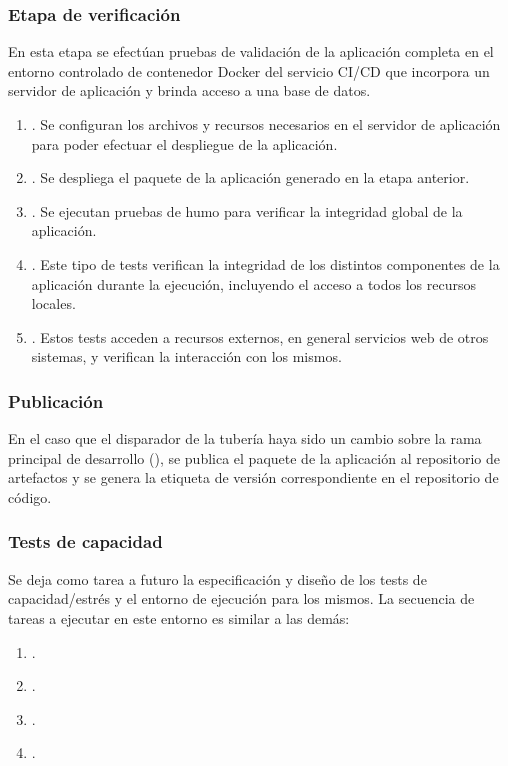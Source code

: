 \subsubsection{Etapa de verificación}
%
En esta etapa se efectúan pruebas de validación de la aplicación
completa en el entorno controlado de contenedor Docker del servicio
CI/CD que incorpora un servidor de aplicación y brinda acceso a una
base de datos.
%
\begin{enumerate}
\item {}. Se configuran
  los archivos y recursos necesarios en el servidor de aplicación para
  poder efectuar el despliegue de la aplicación.
\item {}. Se despliega el paquete de la
  aplicación generado en la etapa anterior.
\item {}. Se ejecutan pruebas de humo para
  verificar la integridad global de la aplicación.
\item {}. Este tipo de tests
  verifican la integridad de los distintos componentes de la
  aplicación durante la ejecución, incluyendo el acceso a todos los
  recursos locales.
\item {}. Estos tests acceden a
  recursos externos, en general servicios web de otros sistemas, y
  verifican la interacción con los mismos.
\end{enumerate}
%
\subsubsection{Publicación}
%
En el caso que el disparador de la tubería haya sido un cambio sobre
la rama principal de desarrollo (), se publica el
paquete de la aplicación al repositorio de artefactos y se genera la
etiqueta de versión correspondiente en el repositorio de código.
%
\subsubsection{Tests de capacidad}
%
Se deja como tarea a futuro la especificación y diseño de los tests de
capacidad/estrés y el entorno de ejecución para los mismos. La
secuencia de tareas a ejecutar en este entorno es similar a las demás:
%
\begin{enumerate}
\item {}.
\item {}.
\item {}.
\item {}.
\end{enumerate}
%
